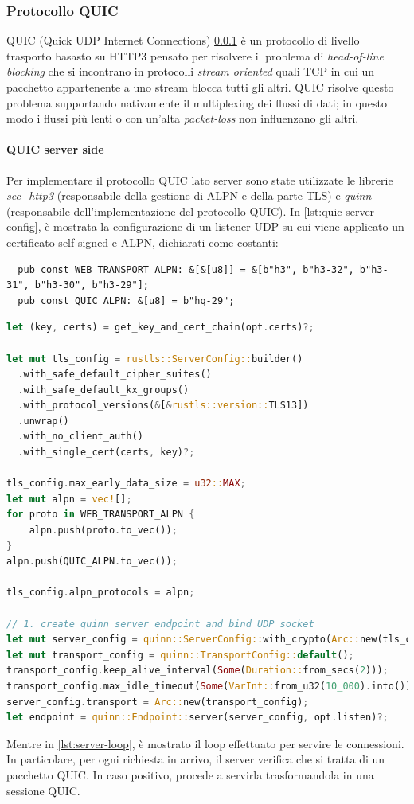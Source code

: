 \documentclass{article}
\begin{document}
\subsubsection{Protocollo QUIC} \label{section:quic-protocol}
QUIC (Quick UDP Internet Connections) \cref{section:quic-protocol}
è un protocollo di livello trasporto basasto su HTTP3 pensato per risolvere il problema di
\textit{head-of-line blocking} che si incontrano in protocolli \textit{stream oriented}
quali TCP in cui un pacchetto appartenente a uno stream blocca tutti gli altri. QUIC risolve
questo problema supportando nativamente il multiplexing dei flussi di dati; in questo modo i
flussi più lenti o con un'alta \textit{packet-loss} non influenzano gli altri.

\paragraph{QUIC server side} Per implementare il protocollo QUIC lato server sono state 
utilizzate le librerie \textit{sec\_http3} (responsabile della gestione di ALPN e della 
parte TLS) e \textit{quinn} (responsabile dell'implementazione del protocollo QUIC).
In \cref{lst:quic-server-config}, è mostrata la configurazione di un listener UDP su cui viene applicato un 
certificato self-signed e ALPN, dichiarati come costanti:

\begin{verbatim}
  pub const WEB_TRANSPORT_ALPN: &[&[u8]] = &[b"h3", b"h3-32", b"h3-31", b"h3-30", b"h3-29"];
  pub const QUIC_ALPN: &[u8] = b"hq-29";
\end{verbatim}

\begin{lstlisting}[language=Rust, style=boxed, label={lst:quic-server-config}, captionpos=b,caption={Configurazione del server QUIC}]
let (key, certs) = get_key_and_cert_chain(opt.certs)?;

let mut tls_config = rustls::ServerConfig::builder()
  .with_safe_default_cipher_suites()
  .with_safe_default_kx_groups()
  .with_protocol_versions(&[&rustls::version::TLS13])
  .unwrap()
  .with_no_client_auth()
  .with_single_cert(certs, key)?;

tls_config.max_early_data_size = u32::MAX;
let mut alpn = vec![];
for proto in WEB_TRANSPORT_ALPN {
    alpn.push(proto.to_vec());
}
alpn.push(QUIC_ALPN.to_vec());

tls_config.alpn_protocols = alpn;

// 1. create quinn server endpoint and bind UDP socket
let mut server_config = quinn::ServerConfig::with_crypto(Arc::new(tls_config));
let mut transport_config = quinn::TransportConfig::default();
transport_config.keep_alive_interval(Some(Duration::from_secs(2)));
transport_config.max_idle_timeout(Some(VarInt::from_u32(10_000).into()));
server_config.transport = Arc::new(transport_config);
let endpoint = quinn::Endpoint::server(server_config, opt.listen)?;

\end{lstlisting}
Mentre in \cref{lst:server-loop}, è mostrato il loop effettuato per servire le connessioni. In particolare,
per ogni richiesta in arrivo, il server verifica che si tratta di un pacchetto QUIC. In 
caso positivo, procede a servirla trasformandola in una sessione QUIC.
\end{document}
